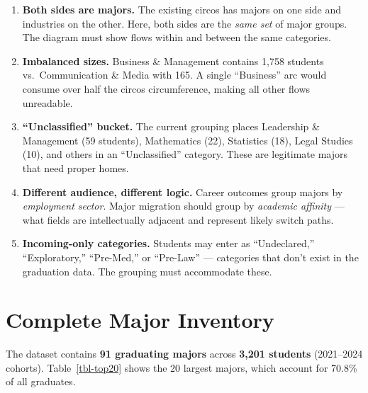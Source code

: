 \documentclass[
  11pt,
  letterpaper,
]{report}
\begin{document}
\begin{enumerate}[leftmargin=2cm, label=\textbf{Problem \arabic*.}, font=\color{USTPurple}]

\item \textbf{Both sides are majors.} The existing circos has majors on one side and industries on the other. Here, both sides are the \textit{same set} of major groups. The diagram must show flows within and between the same categories.

\item \textbf{Imbalanced sizes.} Business \& Management contains 1,758 students vs.\ Communication \& Media with 165. A single ``Business'' arc would consume over half the circos circumference, making all other flows unreadable.

\item \textbf{``Unclassified'' bucket.} The current grouping places Leadership \& Management (59 students), Mathematics (22), Statistics (18), Legal Studies (10), and others in an ``Unclassified'' category. These are legitimate majors that need proper homes.

\item \textbf{Different audience, different logic.} Career outcomes group majors by \textit{employment sector}. Major migration should group by \textit{academic affinity} — what fields are intellectually adjacent and represent likely switch paths.

\item \textbf{Incoming-only categories.} Students may enter as ``Undeclared,'' ``Exploratory,'' ``Pre-Med,'' or ``Pre-Law'' — categories that don't exist in the graduation data. The grouping must accommodate these.

\end{enumerate}

\chapter{Complete Major Inventory}\label{complete-major-inventory}

The dataset contains \textbf{91 graduating majors} across \textbf{3,201
students} (2021--2024 cohorts). Table~\ref{tbl-top20} shows the 20
largest majors, which account for 70.8\% of all graduates.
\end{document}
